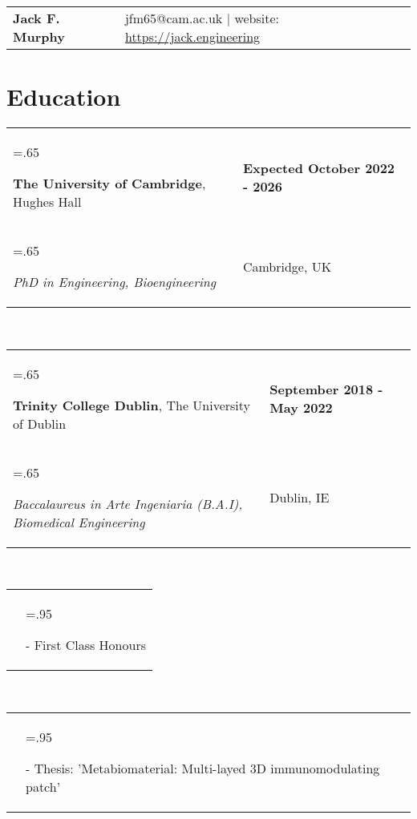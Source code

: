 \documentclass[letterpaper,11pt]{article}
\newcommand{\itemHeadings}[4]{
    \begin{tabularx}{\textwidth} {>{\hsize=.65\textwidth\raggedright\arraybackslash}X 
   >{\raggedleft\arraybackslash}X}
      #1 & \small#2 \\
      #3 & \small#4
    \end{tabularx}
    \\
}
\newcommand{\itemitems}[1]{
    \begin{tabularx}{\textwidth} {>{\raggedleft\arraybackslash}X >{\hsize=.95\textwidth\raggedright\arraybackslash}X}
      &- \small#1 \\
    \end{tabularx}
    \\
}
\newcommand{\heading}[3]{
    \hspace{-15mm}
    \begin{tabular}{p{.4\textwidth} >{\raggedleft}p{.57\textwidth}}
        \textbf{\Huge{#1}}\vspace{5mm} & #2 $|$ #3 \\
    \end{tabular}
}
\newcommand{\sect}[1]{
    \vspace{-.4em}
    \section*{#1}
    \vspace{-3.5mm}
}
\begin{document}
\heading
    {Jack F. Murphy}
    {jfm65@cam.ac.uk}
    {website: \href{https://jack.engineering}{https://jack.engineering}}

\noindent
\vspace{0cm}

\sect{Education}
    \itemHeadings
        {\textbf{The University of Cambridge}, Hughes Hall}
        {\textbf{Expected October 2022 - 2026}}
        {\hspace{5pt}\emph{PhD in Engineering, Bioengineering}}
        {Cambridge, UK}
    \itemHeadings
        {\textbf{Trinity College Dublin}, The University of Dublin}
        {\textbf{September 2018 - May 2022}}
        {\hspace{5pt}\emph{Baccalaureus in Arte Ingeniaria (B.A.I), Biomedical Engineering}}
        {Dublin, IE}
        \itemitems
            {First Class Honours}
        \itemitems
            {Thesis: 'Metabiomaterial: Multi-layed 3D immunomodulating patch'}

\end{document}
